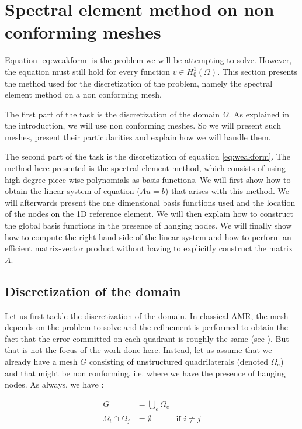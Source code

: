 \section{Spectral element method on non conforming meshes}
Equation \ref{eq:weakform} is the problem we will be attempting to solve. However, the equation must still hold for every function $v \in H_0^1(\Omega)$. This section presents the method used for the discretization of the problem, namely the spectral element method on a non conforming mesh. 

The first part of the task is the discretization of the domain $\Omega$. As explained in the introduction, we will use non conforming meshes. So we will present such meshes, present their particularities and explain how we will handle them.   

The second part of the task is the discretization of equation \ref{eq:weakform}. The method here presented is the spectral element method, which consists of using high degree piece-wise polynomials as basis functions. We will first show how to obtain the linear system of equation ($Au=b$) that arises with this method. We will afterwards present the one dimensional basis functions used and the location of the nodes on the 1D reference element. We will then explain how to construct the global basis functions in the presence of hanging nodes. We will finally show how to compute the right hand side of the linear system and how to perform an efficient matrix-vector product without having to explicitly construct the matrix $A$.

\subsection{Discretization of the domain}

Let us first tackle the discretization of the domain. In classical AMR, the mesh depends on the problem to solve and the refinement is performed to obtain the fact that the error committed on each quadrant is roughly the same (see \cite{amrError}). But that is not the focus of the work done here. Instead, let us assume that we already have a mesh $G$ consisting of unstructured quadrilaterals (denoted $\Omega_e$) and that might be non conforming, i.e. where we have the presence of hanging nodes. As always, we have : 

\begin{align*}
G &= \bigcup\limits_{e} \Omega_e\\
\Omega_i \cap \Omega_j &= \emptyset &\text{if $i\neq j$}
\end{align*}


